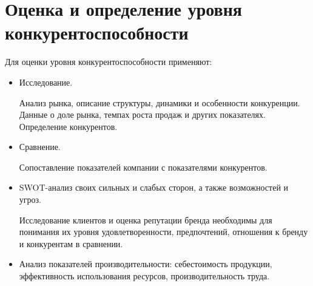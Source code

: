 \section{Оценка и определение уровня конкурентоспособности}
Для оценки уровня конкурентоспособности применяют:
\begin{itemize}
	\item  Исследование. 
	
	Анализ рынка, описание структуры, динамики и особенности конкуренции. Данные о доле рынка, темпах роста продаж и других показателях. Определение конкурентов.
	\item Сравнение. 
	
	Сопоставление показателей компании с показателями конкурентов.
	
	\item SWOT-анализ своих сильных и слабых сторон, а также возможностей и угроз. 
	
	Исследование клиентов и оценка репутации бренда необходимы для понимания их уровня удовлетворенности, предпочтений, отношения к бренду и конкурентам в сравнении.
	\item Анализ показателей производительности: себестоимость продукции, эффективность использования ресурсов, производительность труда.
\end{itemize}








